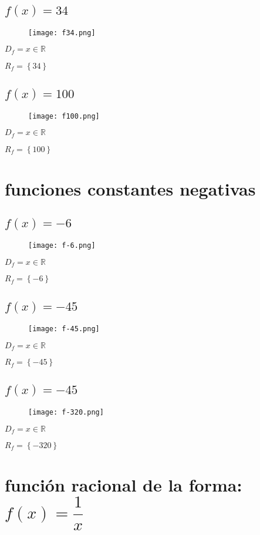 \documentclass[12pt]{article}
\begin{document}
\subsection{$f(x) = 34$}
\begin{figure}[htb] \centering \texttt{[image: f34.png]}
\end{figure}
$D_f = x \in \mathbb{R}  $  \par
$R_f = \left\lbrace34\right\rbrace$
\newpage
\subsection{$f(x) = 100$}
\begin{figure}[htb] \centering \texttt{[image: f100.png]} \end{figure}
$D_f = x \in \mathbb{R}  $  \par
$R_f = \left\lbrace100\right\rbrace$
\section{funciones \cyan constantes negativas}
\subsection{$f(x) = - 6$}
\begin{figure}[htb] \centering \texttt{[image: f-6.png]} \end{figure}
$D_f = x \in \mathbb{R}  $  \par
$R_f = \left\lbrace-6\right\rbrace$
\newpage
\subsection{$f(x) = - 45$}
\begin{figure}[htb] \centering \texttt{[image: f-45.png]} \end{figure}
$D_f = x \in \mathbb{R}  $  \par
$R_f = \left\lbrace-45\right\rbrace$
\subsection{$f(x) = - 45$}
\begin{figure}[htb] \centering \texttt{[image: f-320.png]} \end{figure}
$D_f = x \in \mathbb{R}  $  \par
$R_f = \left\lbrace-320\right\rbrace$
\newpage
\section{función {\cyan racional de la forma}: $f(x) = \dfrac{1}{x}$}
\end{document}
